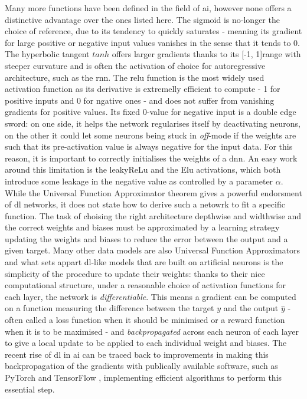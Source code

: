 Many more functions have been defined in the field of \gls{ai}, however none offers a distinctive advantage over the ones listed here. The sigmoid is no-longer the choice of reference, due to its tendency to quickly saturates - meaning its gradient for large positive or negative input values vanishes in the sense that it tends to 0. The hyperbolic tangent $tanh$ offers larger gradients thanks to its [-1, 1]range with steeper curvature and is often the activation of choice for autoregressive architecture, such as the \gls{rnn}. The \gls{relu} function is the most widely used activation function as its derivative is extremelly efficient to compute - 1 for positive inputs and 0 for ngative ones - and does not suffer from vanishing gradients for positive values. Its fixed 0-value for negative input is a double edge sword: on one side, it helps the network regularises itself by deactivating neurons, on the other it could let some neurons being stuck in \textit{off}-mode if the weights are such that its pre-activation value is always negative for the input data. For this reason, it is important to correctly initialises the weights of a \gls{dnn}. An easy work around this limitation is the leakyReLu and the Elu activations, which both introduce some leakage in the negative value as controlled by a parameter $\alpha$.\\
While the Universal Function Approximator theorem gives a powerful endorsment of \gls{dl} networks, it does not state how to derive such a netowrk to fit a specific function. The task of choising the right architecture depthwise and widthwise and the correct weights and biases must be approximated by a learning strategy updating the weights and biases to reduce the error between the output and a given target. Many other data models are also Universal Function Approximators and what sets appart \gls{dl}-like models that are built on artificial neurons is the simplicity of the procedure to update their weights: thanks to their nice computational structure, under a reasonable choice of activation functions for each layer, the network is \textit{differentiable}. This means a gradient can be computed on a function measuring the difference between the target $y$ and the output $\hat{y}$ - often called a loss function when it should be minimised or a reward function when it is to be maximised - and \textit{backpropagated} across each neuron of each layer to give a local update to be applied to each individual weight and biases. The recent rise of \gls{dl} in \gls{ai} can be traced back to improvements in making this backpropagation of the gradients with publically available software, such as PyTorch \cite{pytorch} and TensorFlow \cite{tensorflow2015-whitepaper}, implementing efficient algorithms to perform this essential step. \\
